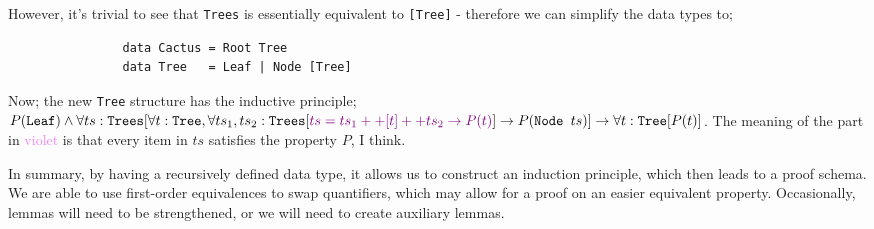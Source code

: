 \documentclass[a4paper, 12pt]{article}
\begin{document}
            However, it's trivial to see that \texttt{Trees} is essentially equivalent to \texttt{[Tree]} - therefore we can simplify the data types to;
            \begin{lstlisting}
                data Cactus = Root Tree
                data Tree   = Leaf | Node [Tree]
            \end{lstlisting}
            Now; the new \texttt{Tree} structure has the inductive principle; $P(\texttt{Leaf}) \land \forall ts : \texttt{Trees} [\forall t : \texttt{Tree}, \forall ts_1, ts_2 : \texttt{Trees} [\textcolor{violet}{ts = ts_1 ++ [t] ++ ts_2 \rightarrow P(t)}] \rightarrow P(\texttt{Node } ts)] \rightarrow \forall t : \texttt{Tree} [P(t)]$. The meaning of the part in \textcolor{violet}{violet} is that every item in $ts$ satisfies the property $P$, I think.
            \medskip

            In summary, by having a recursively defined data type, it allows us to construct an induction principle, which then leads to a proof schema. We are able to use first-order equivalences to swap quantifiers, which may allow for a proof on an easier equivalent property. Occasionally, lemmas will need to be strengthened, or we will need to create auxiliary lemmas.
\end{document}
